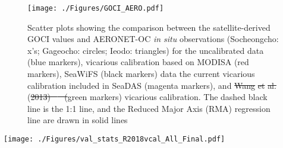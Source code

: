 \documentclass[]{interact}
\theoremstyle{plain}%
\theoremstyle{definition}
\theoremstyle{remark}
\providecommand{\DIFaddtex}[1]{{\protect\color{blue}\uwave{#1}}} %
\providecommand{\DIFdeltex}[1]{{\protect\color{red}\sout{#1}}}                      %
\providecommand{\DIFaddFL}[1]{\DIFadd{#1}} %
\providecommand{\DIFdelFL}[1]{\DIFdel{#1}} %
\providecommand{\DIFaddbeginFL}{} %
\providecommand{\DIFaddendFL}{} %
\providecommand{\DIFdelbeginFL}{} %
\providecommand{\DIFdelendFL}{} %
\providecommand{\DIFadd}[1]{\texorpdfstring{\DIFaddtex{#1}}{#1}} %
\providecommand{\DIFdel}[1]{\texorpdfstring{\DIFdeltex{#1}}{}} %
\newcommand{\DIFscaledelfig}{0.5}
\newlength{\DIFdelgraphicswidth} %
\newlength{\DIFdelgraphicsheight} %
\newcommand{\DIFaddincludegraphics}[2][]{{\color{blue}\fbox{\DIFOincludegraphics[#1]{#2}}}} %
\newcommand{\DIFdelincludegraphics}[2][]{%
\sbox{\DIFdelgraphicsbox}{\DIFOincludegraphics[#1]{#2}}%
\settoboxwidth{\DIFdelgraphicswidth}{\DIFdelgraphicsbox} %
\settoboxtotalheight{\DIFdelgraphicsheight}{\DIFdelgraphicsbox} %
\scalebox{\DIFscaledelfig}{%
\parbox[b]{\DIFdelgraphicswidth}{\usebox{\DIFdelgraphicsbox}\\[-\baselineskip] \rule{\DIFdelgraphicswidth}{0em}}\llap{\resizebox{\DIFdelgraphicswidth}{\DIFdelgraphicsheight}{%
\setlength{\unitlength}{\DIFdelgraphicswidth}%
\begin{picture}(1,1)%
\thicklines\linethickness{2pt} %
{\color[rgb]{1,0,0}\put(0,0){\framebox(1,1){}}}%
{\color[rgb]{1,0,0}\put(0,0){\line( 1,1){1}}}%
{\color[rgb]{1,0,0}\put(0,1){\line(1,-1){1}}}%
\end{picture}%
}\hspace*{3pt}}} %
} %
\DeclareRobustCommand{\DIFaddbeginFL}{\DIFOaddbeginFL \let\includegraphics\DIFaddincludegraphics} %
\DeclareRobustCommand{\DIFaddendFL}{\DIFOaddendFL \let\includegraphics\DIFOincludegraphics} %
\DeclareRobustCommand{\DIFdelbeginFL}{\DIFOdelbeginFL \let\includegraphics\DIFdelincludegraphics} %
\DeclareRobustCommand{\DIFdelendFL}{\DIFOaddendFL \let\includegraphics\DIFOincludegraphics} %
\begin{document}
\begin{figure}[htbp!]
  \centering
    \texttt{[image: ./Figures/GOCI\_AERO.pdf]}

    \caption{Scatter plots showing the comparison between the satellite-derived GOCI values and AERONET-OC {\it in situ} observations (Socheongcho: x's; Gageocho: circles; Ieodo: triangles) for the uncalibrated data (blue markers), vicarious calibration based on MODISA (red markers), SeaWiFS (black markers) data the current vicarious calibration included in SeaDAS (magenta markers), and \DIFdelbeginFL \DIFdelFL{Wang }%
\DIFdelFL{et}%
\DIFdelFL{al. }\DIFdelendFL \DIFaddbeginFL \DIFaddFL{\mbox{%
\cite{Wang:13} }%
}\DIFaddendFL (\DIFdelbeginFL \DIFdelFL{2013) \mbox{%
\citep{Wang:13} }%
(}\DIFdelendFL green markers) vicarious calibration. The dashed black line is the 1:1 line, and the Reduced Major Axis (RMA) regression line are drawn in solid lines \label{fig:GOCI_AERO} } 
\end{figure}
\begin{table}[H]
\caption{Statistics of the atmospheric correction and vicarious calibration validation comparing the two test approaches (in bold) with the uncalibrated and with current vicarious calibration included in SeaDAS. Results with vicarious calibration suggested by \DIFdelbeginFL \DIFdelFL{Wang }%
\DIFdelFL{et}%
\DIFdelFL{al. (2013) \mbox{%
\citep{Wang:13} }%
}\DIFdelendFL \DIFaddbeginFL \DIFaddFL{\mbox{%
\cite{Wang:13} }%
}\DIFaddendFL were also included for comparison. \label{tab:val_stats} }

  \centering
    \texttt{[image: ./Figures/val\_stats\_R2018vcal\_All\_Final.pdf]}

\end{table}
\end{document}
